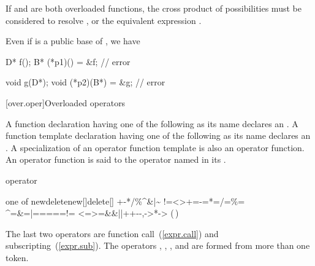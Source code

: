 \pnum
\begin{note}
If
and
are both overloaded functions, the
cross product of possibilities must be considered
to resolve
,
or the equivalent expression
.
\end{note}

\pnum
{}%
\begin{note}
Even if  is a public base of ,
we have

\begin{codeblock}
D* f();
B* (*p1)() = &f;                // error

void g(D*);
void (*p2)(B*) = &g;            // error
\end{codeblock}
\end{note}

[over.oper]{Overloaded operators}%
%
%

\pnum
{}%
%
A function declaration having one of the following
as its name declares an
.
A function template declaration having one of the
following  as its name
declares an . A specialization
of an operator function template is also an operator function.
An operator function is said to
the operator named in its
.

\begin{bnf}
\br
     operator
\end{bnf}

\begin{bnfkeywordtab}
 \textnormal{one of}\br
\>new\>delete\>new[]\>delete[]\br
\>+\>-\>*\>/\>\%\>\^{}\>\&\>|\>\~\br
\>!\>=\><\>>\>+=\>-=\>*=\>/=\>\%=\br
\>\^{}=\>\&=\>|=\>\shl\>\shr\>\shr=\>\shl=\>={=}\>!=\br
\><=\>>=\>\&\&\>|{|}\>++\>-{-}\>,\>->*\>->\br
\>(\,)\>[\,]
\end{bnfkeywordtab}

\begin{note}
The last two operators are function call~(\ref{expr.call})
and subscripting~(\ref{expr.sub}).
The operators
,
,
\tcode{()},
and
\tcode{[]}
are formed from more than one token.
\end{note}
%
%

